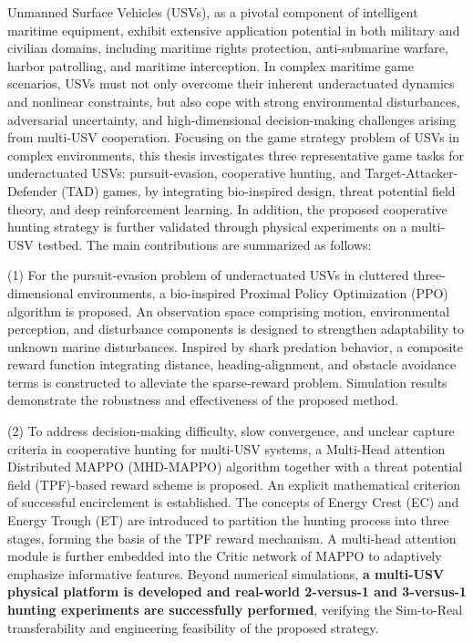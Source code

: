 
\begin{eabstract}
Unmanned Surface Vehicles (USVs), as a pivotal component of intelligent maritime
equipment, exhibit extensive application potential in both military and civilian
domains, including maritime rights protection, anti-submarine warfare, harbor
patrolling, and maritime interception. In complex maritime game scenarios, USVs
must not only overcome their inherent underactuated dynamics and nonlinear
constraints, but also cope with strong environmental disturbances, adversarial
uncertainty, and high-dimensional decision-making challenges arising from multi-USV
cooperation. Focusing on the game strategy problem of USVs in complex environments,
this thesis investigates three representative game tasks for underactuated USVs:
pursuit-evasion, cooperative hunting, and Target-Attacker-Defender (TAD) games,
by integrating bio-inspired design, threat potential field theory, and deep
reinforcement learning. In addition, the proposed cooperative hunting strategy is
further validated through physical experiments on a multi-USV testbed. The main
contributions are summarized as follows:

(1) For the pursuit-evasion problem of underactuated USVs in cluttered
three-dimensional environments, a bio-inspired Proximal Policy Optimization (PPO)
algorithm is proposed. An observation space comprising motion, environmental
perception, and disturbance components is designed to strengthen adaptability to
unknown marine disturbances. Inspired by shark predation behavior, a composite
reward function integrating distance, heading-alignment, and obstacle avoidance
terms is constructed to alleviate the sparse-reward problem. Simulation results
demonstrate the robustness and effectiveness of the proposed method.

(2) To address decision-making difficulty, slow convergence, and unclear capture
criteria in cooperative hunting for multi-USV systems, a Multi-Head attention
Distributed MAPPO (MHD-MAPPO) algorithm together with a threat potential field
(TPF)-based reward scheme is proposed. An explicit mathematical criterion of
successful encirclement is established. The concepts of Energy Crest (EC) and
Energy Trough (ET) are introduced to partition the hunting process into three
stages, forming the basis of the TPF reward mechanism. A multi-head attention
module is further embedded into the Critic network of MAPPO to adaptively
emphasize informative features. Beyond numerical simulations, \textbf{a multi-USV
physical platform is developed and real-world 2-versus-1 and 3-versus-1 hunting
experiments are successfully performed}, verifying the Sim-to-Real transferability
and engineering feasibility of the proposed strategy.


\end{eabstract}

